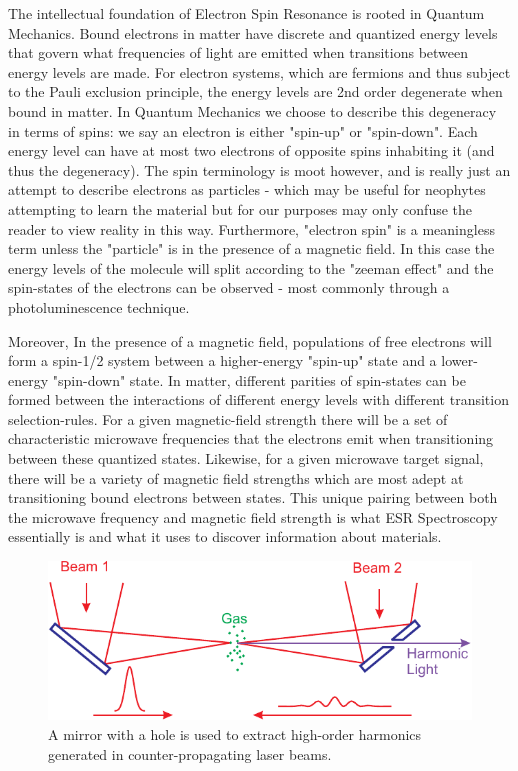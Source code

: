 \documentclass[oneside, astronomy, noacknowlegments]{BYUPhys}
\begin{document}
The intellectual foundation of Electron Spin Resonance is rooted in Quantum Mechanics. Bound electrons in matter have discrete and quantized energy levels that govern what frequencies of light are emitted when transitions between energy levels are made. For electron systems, which are fermions and thus subject to the Pauli exclusion principle, the energy levels are 2nd order degenerate when bound in matter. In Quantum Mechanics we choose to describe this degeneracy in terms of spins: we say an electron is either "spin-up" or "spin-down". Each energy level can have at most two electrons of opposite spins inhabiting it (and thus the degeneracy). The spin terminology is moot however, and is really just an attempt to describe electrons as particles - which may be useful for neophytes attempting to learn the material but for our purposes may only confuse the reader to view reality in this way. Furthermore, "electron spin" is a meaningless term unless the "particle" is in the presence of a magnetic field. In this case the energy levels of the molecule will split according to the "zeeman effect" and the spin-states of the electrons can be observed - most commonly through a photoluminescence technique.

Moreover, In the presence of a magnetic field, populations of free electrons will form a spin-1/2 system between a higher-energy "spin-up" state and a lower-energy "spin-down" state. In matter, different parities of spin-states can be formed between the interactions of different energy levels with different transition selection-rules. For a given magnetic-field strength there will be a set of characteristic microwave frequencies that the electrons emit when transitioning between these quantized states. Likewise, for a given microwave target signal, there will be a variety of magnetic field strengths which are most adept at transitioning bound electrons between states. This unique pairing between both the microwave frequency and magnetic field strength is what ESR Spectroscopy essentially is and what it uses to discover information about materials.

\begin{figure}
    \centerline{\includegraphics{Graphic1}}
    \caption[Zeeman effect and resonant conditions in matter]{\label{fig:Zeeman}
     A mirror with a hole is used to extract high-order harmonics generated in
     counter-propagating laser beams.}
 \end{figure}
\end{document}
